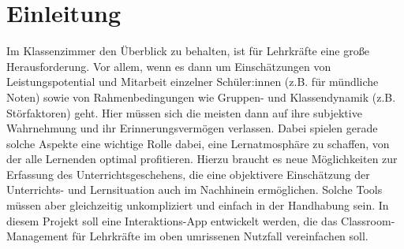 \section{Einleitung}
    Im Klassenzimmer den Überblick zu behalten, ist für Lehrkräfte eine große Herausforderung. Vor allem,
    wenn es dann um Einschätzungen von Leistungspotential und Mitarbeit einzelner Schüler:innen (z.B. für
    mündliche Noten) sowie von Rahmenbedingungen wie Gruppen- und Klassendynamik (z.B. Störfaktoren)
    geht. Hier müssen sich die meisten dann auf ihre subjektive Wahrnehmung und ihr Erinnerungsvermögen
    verlassen. Dabei spielen gerade solche Aspekte eine wichtige Rolle dabei, eine Lernatmosphäre zu schaffen,
    von der alle Lernenden optimal profitieren. Hierzu braucht es neue Möglichkeiten zur Erfassung des Unterrichtsgeschehens, die eine objektivere Einschätzung der Unterrichts- und Lernsituation auch im Nachhinein
    ermöglichen. Solche Tools müssen aber gleichzeitig unkompliziert und einfach in der Handhabung sein.
    In diesem Projekt soll eine Interaktions-App entwickelt werden, die das Classroom-Management für Lehrkräfte im oben umrissenen Nutzfall vereinfachen soll.